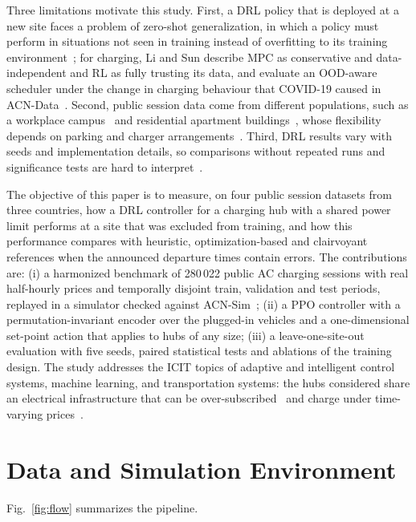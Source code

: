 \documentclass[conference]{IEEEtran}
\begin{document}
Three limitations motivate this study. First, a DRL policy that is deployed at a new site faces a
problem of zero-shot generalization, in which a policy must perform in situations not seen in
training instead of overfitting to its training environment~\cite{kirk2023survey}; for charging,
Li and Sun describe MPC as conservative and data-independent and RL as fully trusting its data, and
evaluate an OOD-aware scheduler under the change in charging behaviour that COVID-19 caused in
ACN-Data~\cite{li2023ood}. Second, public session data come from different populations, such as a
workplace campus~\cite{lee2019acndata} and residential apartment buildings~\cite{sorensen2021data},
whose flexibility depends on parking and charger arrangements~\cite{sorensen2021flex}. Third,
DRL results vary with seeds and implementation details, so comparisons without repeated runs and
significance tests are hard to interpret~\cite{henderson2018matters}.

The objective of this paper is to measure, on four public session datasets from three countries,
how a DRL controller for a charging hub with a shared power limit performs at a site that was
excluded from training, and how this performance compares with heuristic, optimization-based and
clairvoyant references when the announced departure times contain errors. The contributions are:
(i) a harmonized benchmark of 280\,022 public AC charging sessions with real half-hourly prices and
temporally disjoint train, validation and test periods, replayed in a simulator checked against
ACN-Sim~\cite{lee2021acnsim}; (ii) a PPO controller with a permutation-invariant encoder over the
plugged-in vehicles and a one-dimensional set-point action that applies to hubs of any size;
(iii) a leave-one-site-out evaluation with five seeds, paired statistical tests and ablations of
the training design. The study addresses the ICIT topics of adaptive and intelligent control
systems, machine learning, and transportation systems: the hubs considered share an electrical
infrastructure that can be over-subscribed~\cite{lee2021acn} and charge under time-varying
prices~\cite{wan2019modelfree}.

\section{Data and Simulation Environment}
Fig.~\ref{fig:flow} summarizes the pipeline.
\end{document}
